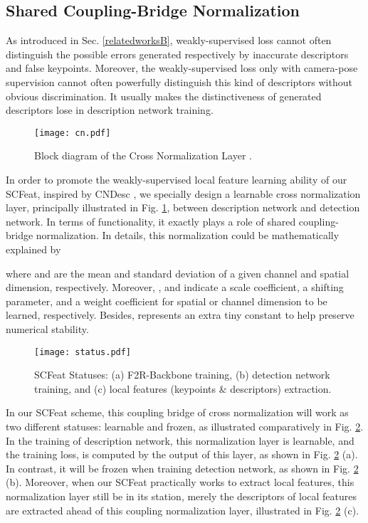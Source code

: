 \documentclass[journal]{IEEEtran}
\begin{document}
\subsection{Shared Coupling-Bridge Normalization}\label{CN}

As introduced in Sec. \ref{relatedworksB}, weakly-supervised loss cannot often distinguish the possible errors generated respectively by inaccurate descriptors and false keypoints. Moreover, the weakly-supervised loss only with camera-pose supervision cannot often powerfully distinguish this kind of descriptors without obvious discrimination. It usually makes the distinctiveness of generated descriptors lose in description network training. 
\begin{figure}[h]
\centering
\texttt{[image: cn.pdf]}
\caption{Block diagram of the Cross Normalization Layer \cite{cndesc}.}
\label{fig_cnl}
\end{figure}



In order to promote the weakly-supervised local feature learning ability of our SCFeat,  
inspired by CNDesc \cite{cndesc}, we specially design a learnable cross normalization layer, principally illustrated in Fig. \ref{fig_cnl}, between description network and detection network. 
In terms of functionality, it exactly plays a role of shared coupling-bridge normalization.
In details, this normalization could be mathematically explained by

where  and  are the mean and standard deviation of a given channel and spatial dimension, respectively. Moreover, ,  and  indicate a scale coefficient, a shifting parameter, and a weight coefficient for spatial or channel dimension to be learned, respectively. Besides,  represents an extra tiny constant to help preserve numerical stability.

\begin{figure}[h]
\centering
\texttt{[image: status.pdf]} \caption{SCFeat Statuses: (a) F2R-Backbone training, (b) detection network training, and (c) local features (keypoints \& descriptors) extraction.}
\label{fig_cnstatus}
\end{figure}

In our SCFeat scheme, this coupling bridge of cross normalization will work as two different statuses: learnable and frozen, as illustrated comparatively in Fig. \ref{fig_cnstatus}. In the training of description network, this normalization layer is learnable, and the training loss,  is computed by the output of this layer, as shown in Fig. \ref{fig_cnstatus} (a). In contrast, it will be frozen when training detection network, as shown in Fig. \ref{fig_cnstatus} (b). Moreover, when our SCFeat practically works to extract local features, this normalization layer still be in its station, merely the descriptors of local features are extracted ahead of this coupling normalization layer, illustrated in Fig. \ref{fig_cnstatus} (c).
\end{document}
